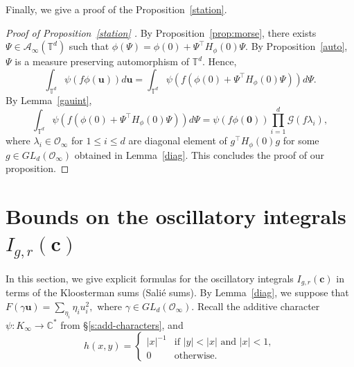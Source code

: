 \documentclass[11pt]{amsart}
\theoremstyle{plain}
\theoremstyle{plain}
\renewcommand{\vec}[1]{\mathbf{#1}}
\theoremstyle{remark}
\theoremstyle{definition}
\newcommand{\CC}{\mathbb{C}}
\newcommand{\TT}{\mathbb{T}}
\newcommand{\cA}{\mathcal{A}}
\newcommand{\cO}{\mathcal{O}}
\newcommand{\cG}{\mathcal{G}}
\begin{document}
Finally, we give a proof of the Proposition~\ref{station}.
\begin{proof}[Proof of Proposition~\ref{station} ]
By Proposition~\ref{prop:morse}, there exists $\Psi \in \cA_{\infty}(\TT^d)$ such that $\phi(\Psi)=\phi(0)+\Psi^{\intercal}H_{\phi}(0)\Psi.$ By Proposition~\ref{auto}, $\Psi$ is a measure preserving automorphism of $\TT^d.$ Hence,
\[
\int_{\TT^d}\psi(f\phi(\vec{u}))d\vec{u}=\int_{\TT^d}\psi(f(\phi(0)+\Psi^{\intercal}H_{\phi}(0)\Psi))d\Psi.
\]
By Lemma~\ref{gauint}, 
\[
\int_{\TT^d}\psi(f(\phi(0)+\Psi^{\intercal}H_{\phi}(0)\Psi))d\Psi=\psi(f \phi(\vec{0})) \prod_{i=1}^{d}\cG (f\lambda_i),
\]
where $\lambda_i \in \cO_{\infty}$ for $1 \leq i\leq d$ are diagonal element of $g^{\intercal}H_{\phi}(0)g$ for some $g\in GL_d(\cO_{\infty})$ obtained in Lemma~\ref{diag}. This concludes the proof of our proposition.
\end{proof}
















\section{Bounds on the oscillatory integrals $I_{g,r}(\vec{c})$}\label{osil}
 
In this section, we give explicit formulas for the oscillatory integrals $I_{g,r}(\vec{c})$ in terms of the  Kloosterman sums (Sali\'e sums). By Lemma~\ref{diag}, we suppose  that $F(\gamma\vec{u})=\sum_{\eta_i} \eta_iu_i^2,$ where $\gamma\in GL_d(\cO_{\infty}).$
 Recall the additive character $\psi:K_\infty\to \CC^*$ from 
\S \ref{s:add-characters}, and 
\[h(x,y)=\begin{cases}|x|^{-1} & \mbox{if $|y|<|x|$ and $|x|<1,$}\\ 0 & \mbox{otherwise.}\end{cases}\]
\end{document}
